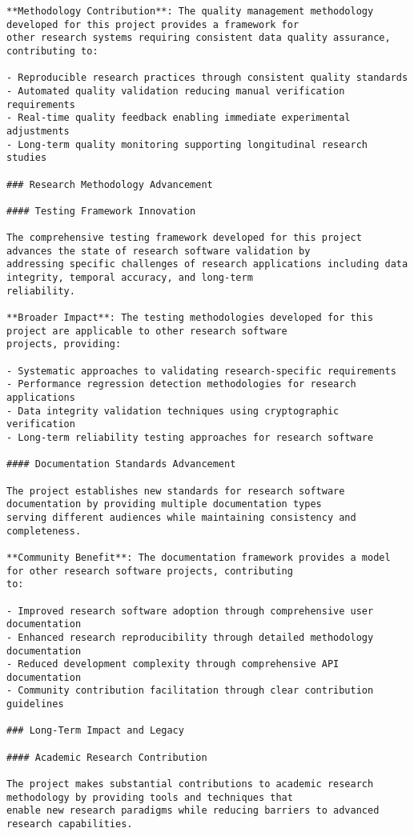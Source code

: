 \documentclass[12pt,a4paper]{report}
\begin{document}
\begin{verbatim}
**Methodology Contribution**: The quality management methodology developed for this project provides a framework for
other research systems requiring consistent data quality assurance, contributing to:

- Reproducible research practices through consistent quality standards
- Automated quality validation reducing manual verification requirements
- Real-time quality feedback enabling immediate experimental adjustments
- Long-term quality monitoring supporting longitudinal research studies

### Research Methodology Advancement

#### Testing Framework Innovation

The comprehensive testing framework developed for this project advances the state of research software validation by
addressing specific challenges of research applications including data integrity, temporal accuracy, and long-term
reliability.

**Broader Impact**: The testing methodologies developed for this project are applicable to other research software
projects, providing:

- Systematic approaches to validating research-specific requirements
- Performance regression detection methodologies for research applications
- Data integrity validation techniques using cryptographic verification
- Long-term reliability testing approaches for research software

#### Documentation Standards Advancement

The project establishes new standards for research software documentation by providing multiple documentation types
serving different audiences while maintaining consistency and completeness.

**Community Benefit**: The documentation framework provides a model for other research software projects, contributing
to:

- Improved research software adoption through comprehensive user documentation
- Enhanced research reproducibility through detailed methodology documentation
- Reduced development complexity through comprehensive API documentation
- Community contribution facilitation through clear contribution guidelines

### Long-Term Impact and Legacy

#### Academic Research Contribution

The project makes substantial contributions to academic research methodology by providing tools and techniques that
enable new research paradigms while reducing barriers to advanced research capabilities.


\end{verbatim}
\end{document}
